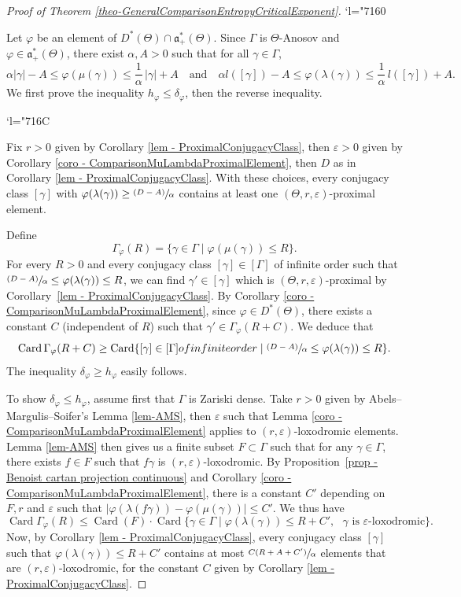 \documentclass[11pt]{article}
\numberwithin{equation}{section}
\newcommand{\quand}{\quad\text{and}\quad}
\newcommand{\psfrac}[2]{\sfrac{(#1)}{#2}}
\newcommand{\Changel}{\mathcode`l="7160}
\newcommand{\Changelback}{\mathcode`l="716C}
\theoremstyle{definition}
\newcommand{\fa}{\mathfrak{a}}
\DeclareMathOperator{\Card}{Card}
\let\epsilon\varepsilon
\let\phi\varphi
\let\G\Gamma
\let\g\gamma
\begin{document}
\begin{proof}[Proof of Theorem \ref{theo-GeneralComparisonEntropyCriticalExponent}]

\Changel

Let $\varphi$ be an element of $D^*(\Theta)\cap \fa_+^*(\Theta)$. Since $\Gamma$ is $\Theta$-Anosov and $\phi \in \fa_+^*(\Theta)$, there exist $\alpha, A>0$ such that for all $\g \in \G$,
\[\alpha \vert \g \vert - A \leq \phi(\mu(\g)) \leq \frac{1}{\alpha}\,\vert \g \vert + A\quand
\alpha l([\g]) - A \leq \phi(\lambda(\g)) \leq \frac{1}{\alpha}\,l([\g]) + A.\]
We first prove the inequality $h_\varphi \leq \delta_\varphi$, then the reverse inequality.

\Changelback

Fix $r>0$ given by Corollary \ref{lem - ProximalConjugacyClass}, then $\epsilon>0$ given by Corollary \ref{coro - ComparisonMuLambdaProximalElement}, then $D$ as in Corollary \ref{lem - ProximalConjugacyClass}. With these choices, every conjugacy class $[\gamma]$ with $\phi(\lambda(\g)) \geq \psfrac{D-A}{\alpha}$ contains at least one $(\Theta,r,\epsilon)$-proximal element.

Define
\[\Gamma_\phi(R) =\{\g \in \G \mid \phi(\mu(\gamma)) \leq R\}.\]
For every $R>0$ and every conjugacy class $[\g] \in [\G]$ of infinite order such that $\psfrac{D-A}{\alpha}\leq \varphi(\lambda(\g)) \leq R$, we can find $\g' \in [\g]$ which is $(\Theta,r,\epsilon)$-proximal by Corollary~\ref{lem - ProximalConjugacyClass}. By Corollary \ref{coro - ComparisonMuLambdaProximalElement}, since $\varphi \in D^*(\Theta)$, there exists a constant $C$ (independent of $R$) such that $\gamma' \in \Gamma_\phi(R+C)$. We deduce that
\[\Card \Gamma_\phi(R+C) \geq \Card \{[\g] \in [\Gamma] \textrm{ of infinite order } \mid \psfrac{D-A}{\alpha}\leq \varphi(\lambda(\g))\leq R\}.\]
The inequality $\delta_\varphi \geq h_\varphi$ easily follows.

To show $\delta_\varphi \leq h_\varphi$, assume first that $\G$ is Zariski dense. Take $r>0$ given by Abels--Margulis--Soifer's Lemma \ref{lem-AMS}, then $\epsilon$ such that Lemma \ref{coro - ComparisonMuLambdaProximalElement} applies to $(r,\epsilon)$\nobreakdash-loxo\-dromic elements. Lemma \ref{lem-AMS} then gives us a finite subset $F\subset \G $ such that for any $\g\in \G$, there exists $f\in F$ such that $f\g$ is $(r,\epsilon)$-loxodromic. By Proposition~\ref{prop - Benoist cartan projection continuous} and Corollary \ref{coro - ComparisonMuLambdaProximalElement}, there is a constant $C'$ depending on $F, r$ and $\epsilon$ such that \hbox{$|\varphi(\lambda(f\g)) - \varphi(\mu(\g))|\leq C'$}. We thus have
\[
\Card\Gamma_\phi(R) \leq \Card(F) \cdot \Card\{ \g \in \Gamma \mid \phi(\lambda(\g)) \leq R+C', \textrm{ $\g$ is $\epsilon$-loxodromic}\}.\]
Now, by Corollary \ref{lem - ProximalConjugacyClass}, every conjugacy class $[\g]$ such that $\phi(\lambda(\gamma)) \leq R+C'$ contains at most $\sfrac{C(R+A+C')}{\alpha}$ elements that are $(r,\epsilon)$-loxodromic, for the constant $C$ given by Corollary \ref{lem - ProximalConjugacyClass}.


\end{proof}
\end{document}
